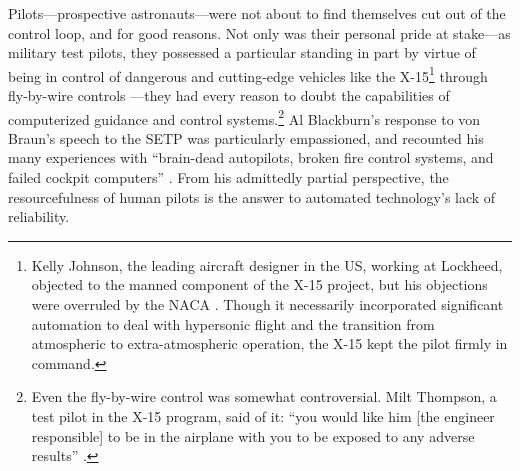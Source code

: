 Pilots---prospective astronauts---were not about to find themselves
cut out of the control loop, and for good reasons. Not only was their
personal pride at stake---as military test pilots, they possessed a
particular standing in part by virtue of being in control of dangerous
and cutting-edge vehicles like the X-15\footnote{Kelly Johnson, the leading aircraft
designer in the US, working at Lockheed, objected to the manned
component of the X-15
project, but his objections were overruled by the NACA \cite[p.
  46]{DM}. Though it necessarily
incorporated significant automation to deal with hypersonic flight and
the transition from atmospheric to extra-atmospheric operation, the X-15 kept
the pilot firmly in command.} through fly-by-wire controls \cite[p.
  55, 61--62, 77]{hypersonics}---they had  
every reason to doubt the capabilities of computerized guidance and
control systems.\footnote{Even the fly-by-wire control was somewhat
  controversial. Milt Thompson, a test pilot in the X-15 program, said
  of it: ``you would like him [the engineer responsible] to be in the
airplane with you to be exposed to any adverse results'' \cite[p.
  55]{DM}.} Al Blackburn's response to von Braun's speech to the
SETP was particularly empassioned, and recounted his many experiences with
``brain-dead autopilots, broken fire control systems, and failed cockpit
computers'' \cite[p. 68]{DM}. From
his admittedly partial perspective, the resourcefulness of human
pilots is the answer to automated technology's lack of reliability.





